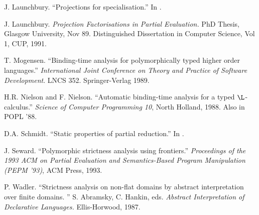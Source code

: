 \begin{article}
\begin{thebibliography}{123456}
J. Launchbury.
``Projections for specialisation.''
In \cite{BEJ88}.

J. Launchbury. 
{\it Projection Factorisations in Partial Evaluation.} PhD
Thesis, Glasgow University, Nov 89. Distinguished Dissertation in
Computer Science, Vol 1, CUP, 1991.

T. Mogensen.
``Binding-time analysis for polymorphically typed higher order languages.''
{\it International Joint Conference on Theory and Practice of Software
Development}. LNCS 352. Springer-Verlag 1989.

H.R. Nielson and F. Nielson.
``Automatic binding-time analysis for a typed $\L$-calculus.''
{\it Science of Computer Programming 10},
North Holland, 1988.  Also in POPL '88.

D.A. Schmidt.
``Static properties of partial reduction.''
In \cite{BEJ88}.

J. Seward.
``Polymorphic strictness analysis using frontiers.''
{\it Proceedings of the 1993 ACM on Partial Evaluation and
Semantics-Based Program Manipulation (PEPM '93)},
ACM Press, 1993.

P. Wadler.
``Strictness analysis on non-flat domains by abstract interpretation over finite domains. '' 
S. Abramsky, C. Hankin, eds.
{\it Abstract Interpretation of Declarative Languages.}
Ellis-Horwood, 1987.


\end{thebibliography}

\end{article}


